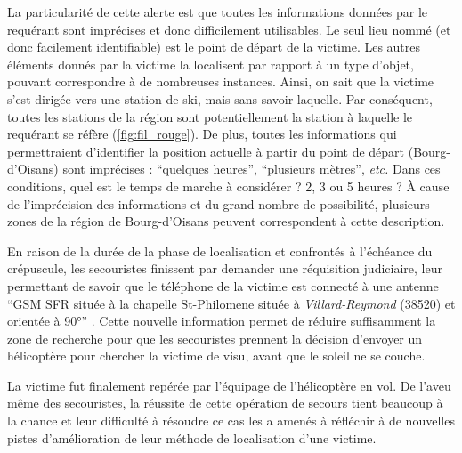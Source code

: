La particularité de cette alerte est que toutes les informations
données par le requérant sont imprécises et donc difficilement
utilisables. Le seul lieu nommé (et donc facilement identifiable) est
le point de départ de la victime. Les autres éléments donnés par la
victime la localisent par rapport à un type d'objet, pouvant
correspondre à de nombreuses instances. Ainsi, on sait que la victime
s'est dirigée vers une station de ski, mais sans savoir laquelle. Par
conséquent, toutes les stations de la région sont potentiellement la
station à laquelle le requérant se réfère
(\autoref{fig:fil_rouge}). De plus, toutes les informations qui
permettraient d'identifier la position actuelle à partir du point de
départ (\ie Bourg-d'Oisans) sont imprécises : \enquote{quelques
  heures}, \enquote{plusieurs mètres}, \emph{etc.} Dans ces
conditions, quel est le temps de marche à considérer ? 2, 3 ou 5
heures ? À cause de l'imprécision des informations et du grand nombre
de possibilité, plusieurs zones de la région de Bourg-d'Oisans peuvent
correspondent à cette description.

En raison de la durée de la phase de localisation et confrontés à
l'échéance du crépuscule, les secouristes finissent par demander une
réquisition judiciaire, leur permettant de savoir que le téléphone de
la victime est connecté à une antenne \enquote{GSM SFR située à la
  chapelle St-Philomene située à \emph{Villard-Reymond} (\num{38520})
  et orientée à 90°} \autocite{OlteanuRaimond2017}. Cette nouvelle
information permet de réduire suffisamment la zone de recherche pour
que les secouristes prennent la décision d'envoyer un hélicoptère pour
chercher la victime de visu, avant que le soleil ne se couche.

La victime fut finalement repérée par l'équipage de l'hélicoptère en
vol. De l'aveu même des secouristes, la réussite de cette opération de
secours tient beaucoup à la chance et leur difficulté à résoudre ce
cas les a amenés à réfléchir à de nouvelles pistes d'amélioration de
leur méthode de localisation d'une victime.

